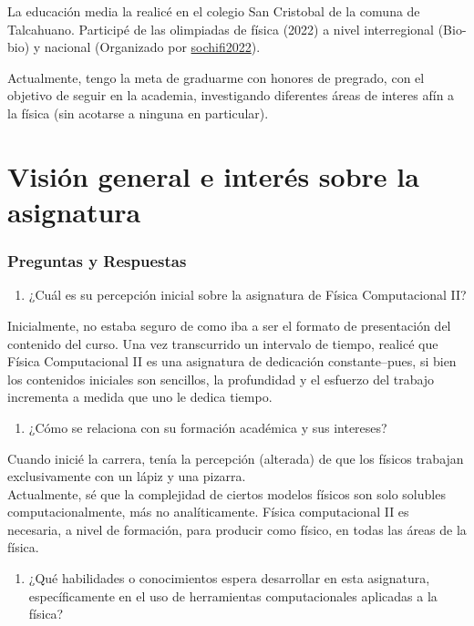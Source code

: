 La educación media la realicé en el colegio San Cristobal de la comuna de Talcahuano.
 Participé de las olimpiadas de física (2022) a nivel interregional (Bio-bio) y nacional (Organizado por \href{https://sochifi2022.com/}{sochifi2022}).

Actualmente, tengo la meta de graduarme con honores de pregrado, con el objetivo de seguir en la academia, investigando diferentes áreas de interes afín a la física (sin acotarse a ninguna en particular).



\section*{Visión general e interés sobre la asignatura}
\subsubsection{Preguntas y Respuestas}
\begin{enumerate}[start=1, label={\bfseries \arabic*})]
\item ¿Cuál es su percepción inicial sobre la asignatura de Física Computacional II?
\end{enumerate}

Inicialmente, no estaba seguro de como iba a ser el formato de presentación del contenido del curso. Una vez transcurrido un intervalo de tiempo, realicé que Física Computacional II es una asignatura de dedicación constante--pues, si bien los contenidos iniciales son sencillos, la profundidad y el esfuerzo del trabajo incrementa a medida que uno le dedica tiempo.
\begin{enumerate}[start=2, label={\bfseries \arabic*})]
\item ¿Cómo se relaciona con su formación académica y sus intereses?
\end{enumerate}

Cuando inicié la carrera, tenía la percepción (alterada) de que los físicos trabajan exclusivamente con un lápiz y una pizarra.\\
Actualmente, sé que la complejidad de ciertos modelos físicos son solo solubles computacionalmente, más no analíticamente. Física computacional II es necesaria, a nivel de formación, para producir como físico, en todas las áreas de la física.
\begin{enumerate}[start=3, label={\bfseries \arabic*})]
\item ¿Qué habilidades o conocimientos espera desarrollar en esta asignatura, específicamente en el uso de herramientas computacionales aplicadas a la física?
\end{enumerate}

